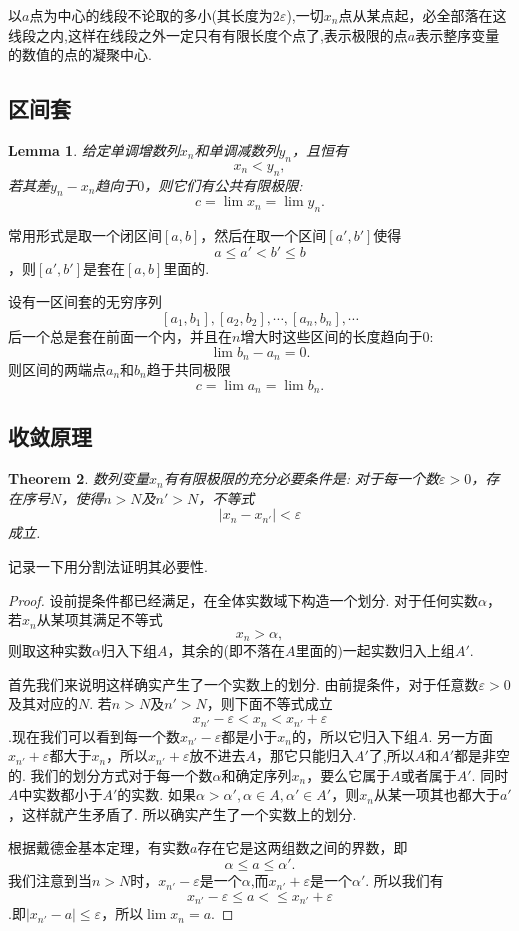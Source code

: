 \documentclass{article}
\newtheorem{theorem}{Theorem}[section]
\newtheorem{lemma}[theorem]{Lemma}
\begin{document}
以$a$点为中心的线段不论取的多小(其长度为$2\varepsilon$),一切$x_n$点从某点起，必全部落在这线段之内,这样在线段之外一定只有有限长度个点了,表示极限的点$a$表示整序变量的数值的点的凝聚中心.

\subsection{区间套}

\begin{lemma}
给定单调增数列$x_n$和单调减数列$y_n$，且恒有\[x_n < y_n,\]若其差$y_n - x_n$趋向于$0$，则它们有公共有限极限:\[c = \lim x_n  = \lim y_n.\]
\end{lemma}

常用形式是取一个闭区间$[a,b]$，然后在取一个区间$[a',b']$使得\[a \leq a' < b' \leq b\]，则$[a',b']$是套在$[a,b]$里面的.

设有一区间套的无穷序列\[[a_1,b_1],[a_2,b_2],\cdots,[a_n,b_n],\cdots\]后一个总是套在前面一个内，并且在$n$增大时这些区间的长度趋向于$0$:\[\lim b_n - a_n = 0.\]则区间的两端点$a_n$和$b_n$趋于共同极限\[c = \lim a_n = \lim b_n.\]

\subsection{收敛原理}

\begin{theorem}
数列变量$x_n$有有限极限的充分必要条件是: 对于每一个数$\varepsilon > 0$，存在序号$N$，使得$n > N$及$n' > N$，不等式\[|x_n - x_{n'}| < \varepsilon\]成立.
\end{theorem}

记录一下用分割法证明其必要性.
\begin{proof}
设前提条件都已经满足，在全体实数域下构造一个划分. 对于任何实数$\alpha$，若$x_n$从某项其满足不等式\[x_n > \alpha,\]则取这种实数$\alpha$归入下组$A$，其余的(即不落在$A$里面的)一起实数归入上组$A'$.

首先我们来说明这样确实产生了一个实数上的划分. 由前提条件，对于任意数$\varepsilon>0$及其对应的$N$. 若$n > N$及$n' > N$，则下面不等式成立\[x_{n'} - \varepsilon < x_n < x_{n'}+\varepsilon\].现在我们可以看到每一个数$x_{n'} - \varepsilon$都是小于$x_n$的，所以它归入下组$A$. 另一方面$x_{n'}+\varepsilon$都大于$x_n$，所以$x_{n'}+\varepsilon$放不进去$A$，那它只能归入$A'$了,所以$A$和$A'$都是非空的. 我们的划分方式对于每一个数$\alpha$和确定序列$x_n$，要么它属于$A$或者属于$A'$. 同时$A$中实数都小于$A'$的实数. 如果$\alpha > \alpha', \alpha \in A , \alpha' \in A'$，则$x_n$从某一项其也都大于$a'$，这样就产生矛盾了. 所以确实产生了一个实数上的划分.

根据戴德金基本定理，有实数$a$存在它是这两组数之间的界数，即\[\alpha \leq a \leq \alpha'.\]我们注意到当$n > N$时，$x_{n'} - \varepsilon$是一个$\alpha$,而$x_{n'} +\varepsilon$是一个$\alpha'$. 所以我们有\[x_{n'} - \varepsilon \leq a < \leq x_{n'} + \varepsilon\].即$|x_{n'}-a| \leq \varepsilon$，所以$\lim x_n = a$.
\end{proof}
\end{document}
